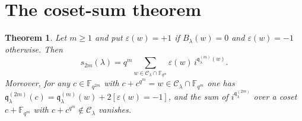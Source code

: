 \documentclass[12pt,a4paper]{amsart}
\newtheorem{theorem}{Theorem}[section]
\theoremstyle{definition}
\newcommand{\F}{\mathbb{F}}
\newcommand{\eps}{\varepsilon}
\newcommand{\Cc}{\mathcal{C}}
\newcommand{\qq}{\mathfrak{q}}
\begin{document}
\section{The coset-sum theorem}\label{sec:cosetsum}

\begin{theorem}\label{thm:cosetsum}
Let $m\ge1$ and put $\eps(w)=+1$ if $B_\lambda(w)=0$ and $\eps(w)=-1$ otherwise. Then
\begin{equation}\label{eq:cosetsum}
s_{2m}(\lambda)=q^m\sum_{w\in\Cc_\lambda\cap\F_{q^m}}\eps(w)\,i^{\qq^{(m)}_\lambda(w)} .
\end{equation}
Moreover, for any $c\in\F_{q^{2m}}$ with $c+c^{q^m}=w\in\Cc_\lambda\cap\F_{q^m}$ one has $\qq^{(2m)}_\lambda(c)=\qq^{(m)}_\lambda(w)+2[\eps(w)=-1]$, and the sum of $i^{\qq^{(2m)}_\lambda}$ over a coset $c+\F_{q^m}$ with $c+c^{q^m}\notin\Cc_\lambda$ vanishes.
\end{theorem}
\end{document}
